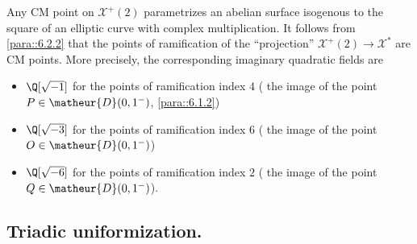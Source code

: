 \begin{para}\label{para::6.2.9} Any CM point on $\mathcal{X}^+(2)$
 parametrizes an abelian surface isogenous to the square of an elliptic 
 curve with complex multiplication. It follows from \ref{para::6.2.2}
 that the points 
 of ramification of the ``projection'' $\mathcal{X}^+(2)\to
 \mathcal{X}^\ast$ are CM points. More precisely, the corresponding
 imaginary quadratic fields are  

\begin{itemize}
 \item $\Q[\sqrt {-1}]$ for the points of ramification index $4$ (\eg 
       the image of the point $P\in \matheur{D}(0,1^-)$, \cf \ref{para::6.1.2})
 \item $\Q[ \sqrt{-3}]$ for the points of ramification index $6$ (\eg 
       the image of the point $O\in \matheur{D}(0,1^-)$) 
 \item $\Q[\sqrt {-6}]$ for the points of ramification index $2$ (\eg 
       the image of the point $Q\in \matheur{D}(0,1^-)$). 
\end{itemize}
\end{para}


\subsection{Triadic uniformization.}\label{sub::6.3}

